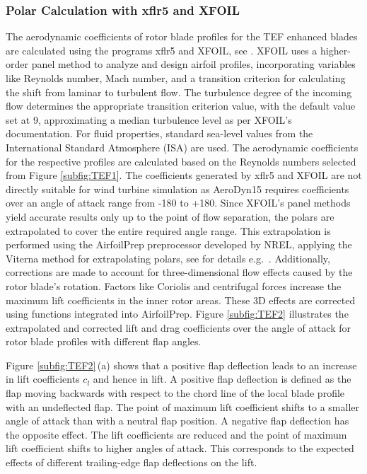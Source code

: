\subsubsection{Polar Calculation with xflr5 and XFOIL}
The aerodynamic coefficients of rotor blade profiles for the TEF enhanced blades are calculated using the programs xflr5 and XFOIL, see \cite{drela1989xfoil}. XFOIL uses a higher-order panel method to analyze and design airfoil profiles, incorporating variables like Reynolds number, Mach number, and a transition criterion for calculating the shift from laminar to turbulent flow. The turbulence degree of the incoming flow determines the appropriate transition criterion value, with the default value set at 9, approximating a median turbulence level as per XFOIL's documentation. For fluid properties, standard sea-level values from the International Standard Atmosphere (ISA) are used. The aerodynamic coefficients for the respective profiles are calculated based on the Reynolds numbers selected from Figure \ref{subfig:TEF1}. The coefficients generated by xflr5 and XFOIL are not directly suitable for wind turbine simulation as AeroDyn15 requires coefficients over an angle of attack range from -180\textdegree{} to +180\textdegree. Since XFOIL's panel methods yield accurate results only up to the point of flow separation, the polars are extrapolated to cover the entire required angle range. This extrapolation is performed using the AirfoilPrep preprocessor developed by NREL, applying the Viterna method for extrapolating polars, see for details e.g.~\cite{gasch2011wind}. %
Additionally, corrections are made to account for three-dimensional flow effects caused by the rotor blade's rotation. Factors like Coriolis and centrifugal forces increase the maximum lift coefficients in the inner rotor areas. These 3D effects are corrected using functions integrated into AirfoilPrep. Figure \ref{subfig:TEF2} illustrates the extrapolated and corrected lift and drag coefficients over the angle of attack for rotor blade profiles with different flap angles. 

Figure \ref{subfig:TEF2}\,(a) shows that a positive flap deflection leads to an increase in lift coefficients $c_l$ and hence in lift. A positive flap deflection is defined as the flap moving backwards with respect to the chord line of the local blade profile with an undeflected flap. The point of maximum lift coefficient shifts to a smaller angle of attack than with a neutral flap position. A negative flap deflection has the opposite effect. The lift coefficients are reduced and the point of maximum lift coefficient shifts to higher angles of attack. This corresponds to the expected effects of different trailing-edge flap deflections on the lift. 


